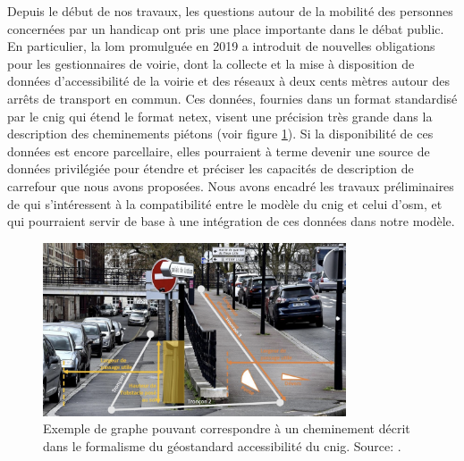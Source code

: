 Depuis le début de nos travaux, les questions autour de la mobilité des personnes concernées par un handicap ont pris une place importante dans le débat public. En particulier, la \gls{lom} promulguée en 2019 a introduit de nouvelles obligations pour les gestionnaires de voirie, dont la collecte et la mise à disposition de données d'accessibilité de la voirie et des réseaux à deux cents mètres autour des arrêts de transport en commun. Ces données, fournies dans un format standardisé par le \gls{cnig} \citep{geostandard2021} qui étend le format \gls{netex}, visent une précision très grande dans la description des cheminements piétons (voir figure \ref{fig:conclusion_exemple_lom}). Si la disponibilité de ces données est encore parcellaire, elles pourraient à terme devenir une source de données privilégiée pour étendre et préciser les capacités de description de carrefour que nous avons proposées. Nous avons encadré les travaux préliminaires de \citet{WadjomKammegne2021} qui s'intéressent à la compatibilité entre le modèle du \gls{cnig} et celui d'\gls{osm}, et qui pourraient servir de base à une intégration de ces données dans notre modèle.

\begin{figure}[ht]
    \centering
    \includegraphics[width=0.8\textwidth]{images/conclusion/graphe_geostandard.png}
    \caption[Graphe de cheminement du géostandard]{Exemple de graphe pouvant correspondre à un cheminement décrit dans le formalisme du géostandard accessibilité du \gls{cnig}. Source: \citep{geostandard2021}.}
    \label{fig:conclusion_exemple_lom}
\end{figure}

\newpar{}

